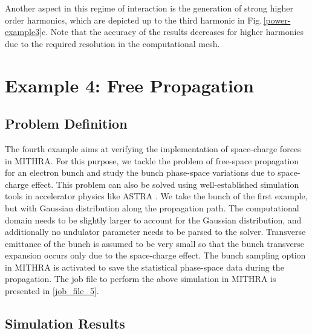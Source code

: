 Another aspect in this regime of interaction is the generation of strong higher order harmonics, which are depicted up to the third harmonic in Fig.\,\ref{power-example3}c.
%
Note that the accuracy of the results decreases for higher harmonics due to the required resolution in the computational mesh.

\section{Example 4: Free Propagation}

\subsection{Problem Definition}

The fourth example aims at verifying the implementation of space-charge forces in MITHRA.
%
For this purpose, we tackle the problem of free-space propagation for an electron bunch and study the bunch phase-space variations due to space-charge effect.
%
This problem can also be solved using well-established simulation tools in accelerator physics like ASTRA \cite{flottmann2011astra}.
%
We take the bunch of the first example, but with Gaussian distribution along the propagation path.
%
The computational domain needs to be slightly larger to account for the Gaussian distribution, and additionally no undulator parameter needs to be parsed to the solver.
%
Transverse emittance of the bunch is assumed to be very small so that the bunch transverse expansion occurs only due to the space-charge effect.
%
The bunch sampling option in MITHRA is activated to save the statistical phase-space data during the propagation.
%
The job file to perform the above simulation in MITHRA is presented in \ref{job_file_5}.

\subsection{Simulation Results}

